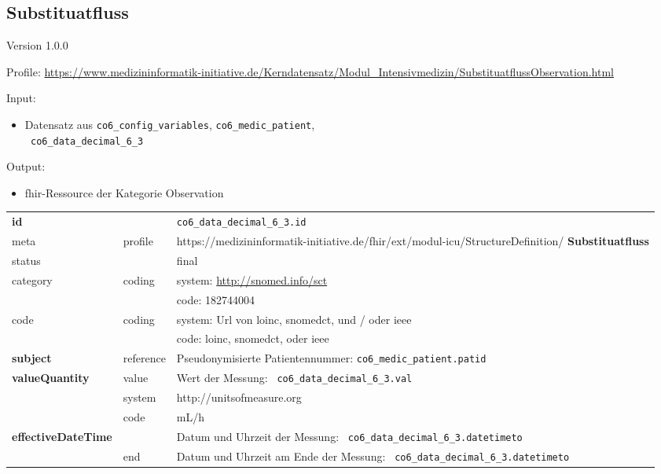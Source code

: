 \subsection{Substituatfluss} 
\noindent Version 1.0.0

\noindent Profile: \url{https://www.medizininformatik-initiative.de/Kerndatensatz/Modul_Intensivmedizin/SubstituatflussObservation.html}

\noindent Input:
\begin{itemize}
	\item Datensatz aus \texttt{co6\_config\_variables}, \texttt{co6\_medic\_patient}, \\ \texttt{
co6\_data\_decimal\_6\_3}
\end{itemize}
Output:
\begin{itemize}
        \item \ac{fhir}-Ressource der Kategorie \glqq Observation\grqq{}
\end{itemize}
\begin{longtable}{|l|l|p{7.5cm}|}
        \hline
        \rowcolor{lightgray} \multicolumn{3}{|l|}{Data Mapping (inhaltlich)} \\ \hline
        \textbf{id} &  & \texttt{co6\_data\_decimal\_6\_3.id} \\ \hline
	meta & profile & https://medizininformatik-initiative.de/fhir/ext/modul-icu/StructureDefinition/\textbf{
Substituatfluss} \\ \hline 
	status &  & final   \\ \hline 
	category & coding & system: \url{http://snomed.info/sct} \\
\cline{3-3}
	& & code: 182744004 \\ \hline
	code & coding & system: Url von \ac{loinc}, \ac{snomedct}, und / oder \ac{ieee} \\ 
	\cline{3-3} 
	 &  & code: \ac{loinc}, \ac{snomedct}, oder \ac{ieee} \\ \hline
	 \textbf{subject}  & reference & Pseudonymisierte Patientennummer: \texttt{co6\_medic\_patient.patid} \\ \hline
	 \textbf{valueQuantity}  & value & Wert der Messung: \texttt{
co6\_data\_decimal\_6\_3.val} \\
        \cline{2-3}
         & system & http://unitsofmeasure.org \\
         \cline{2-3}
         & code & mL/h \\ \hline
     \textbf{effectiveDateTime}  & & Datum und Uhrzeit der Messung: \texttt{
co6\_data\_decimal\_6\_3.datetimeto} \\
    \cline{2-3}
     & end & Datum und Uhrzeit am Ende der Messung: \texttt{
co6\_data\_decimal\_6\_3.datetimeto} \\ \hline
\end{longtable}


